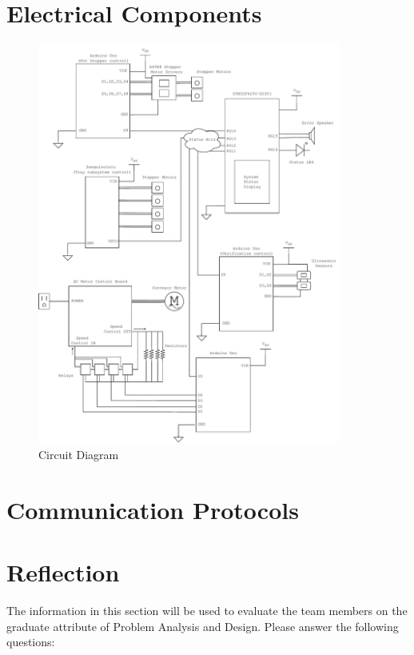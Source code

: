 \documentclass[12pt, titlepage]{article}
\begin{document}
\section{Electrical Components}

\begin{figure}[H]
  \centering
  \includegraphics[width=0.89\textwidth]{circuit_diagram.pdf}
  \caption{Circuit Diagram}
  \label{fig:circuit}
\end{figure}

\section{Communication Protocols}

\section{Reflection}

The information in this section will be used to evaluate the team members on the
graduate attribute of Problem Analysis and Design.  Please answer the following questions:
\end{document}
